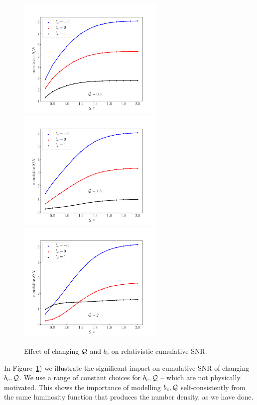 \begin{itemize}
\begin{figure}[ht]
\includegraphics[width=7cm]{fig/cumulativeSnrdopplerQ0_5-eps-converted-to} \\
\includegraphics[width=7cm]{fig/cumulativeSnrdopplerQ1_5-eps-converted-to}
\includegraphics[width=7cm]{fig/cumulativeSnrdopplerQ2_0-eps-converted-to} 
\caption{Effect of changing ${\cal Q}$ and $b_e$ on relativistic cumulative SNR.} \label{fig1x}
\end{figure}
In Figure~\ref{fig1x}) we illustrate the significant impact on cumulative SNR of changing $b_e,\mathcal{Q}$. We use a range of constant choices for $b_e,\mathcal{Q}$ -- which are not physically motivated. This shows the importance of modelling $b_e,\mathcal{Q}$ self-consistently from the same  luminosity function that produces the number density, as we have done. 
\end{itemize}

